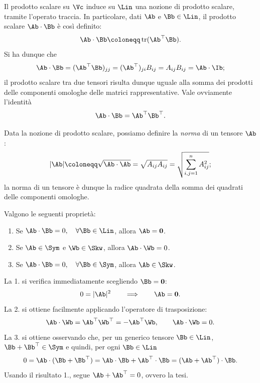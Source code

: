 Il prodotto scalare su $\Vc$ induce su $\Lin$ una nozione di prodotto scalare, tramite l'operato traccia. In particolare, dati $\Ab$ e $\Bb\in \Lin$, il prodotto scalare $\Ab \cdot \Bb$ è così definito:
\begin{equation}
\Ab \cdot \Bb \coloneqq \operatorname{tr}(\Ab ^\top \Bb).
\end{equation}
Si ha dunque che 
\begin{equation}
\Ab \cdot \Bb = (\Ab ^\top \Bb)_{jj}=(\Ab ^\top)_{ji}B_{ij}=A_{ij}B_{ij}=\Ab \cdot \Ib;
\end{equation}
 il prodotto scalare tra due tensori risulta dunque  uguale alla somma dei prodotti delle componenti omologhe delle matrici rappresentative. Vale ovviamente l'identità
 \begin{equation}
 	\Ab \cdot \Bb =\Ab ^\top \Bb ^\top.
 \end{equation}
 
 Data la nozione di prodotto scalare, possiamo definire la \textit{norma} di un tensore $\Ab$:
 \begin{equation}
 |\Ab|\coloneqq \sqrt{\Ab \cdot \Ab}=\sqrt{A_{ij}A_{ij}}=\sqrt{\sum_{i,j=1}^n A_{ij}^2};
 \end{equation}
la norma di un tensore è dunque la radice quadrata della somma dei quadrati delle componenti omologhe.

\vspace{.5cm}

\noindent Valgono le seguenti proprietà:
\begin{enumerate}
	\item Se $\Ab \cdot \Bb=0, \quad \forall \Bb \in \Lin$, allora $\Ab =\mathbf{0}$.
	\item Se $\Ab \in \Sym$ e $\Wb \in \Skw$, allora $\Ab \cdot \Wb =0$.
	\item Se $\Ab \cdot \Bb=0, \quad \forall \Bb \in \Sym$, allora $\Ab \in \Skw$.
\end{enumerate}

La 1. si verifica immediatamente scegliendo $\Bb =\mathbf{0}$:
\begin{equation}
0=|\Ab|^2 \qquad \Longrightarrow\qquad \Ab =\mathbf{0}.
\end{equation}
La 2. si ottiene facilmente applicando l'operatore di trasposizione:
\begin{equation}
\Ab \cdot \Wb =\Ab^\top \Wb^\top=-\Ab^\top \Wb, \qquad \Ab \cdot \Wb=0.
\end{equation}
La 3. si ottiene osservando che, per un generico tensore $\Bb \in \Lin$, $\Bb + \Bb ^\top\in \Sym$ e quindi, per ogni $\Bb \in \Lin$
\begin{equation}
0=\Ab \cdot (\Bb +\Bb ^\top)=\Ab \cdot \Bb + \Ab ^\top \cdot \Bb =(\Ab + \Ab ^\top)\cdot \Bb.
\end{equation}
Usando il risultato 1., segue $\Ab + \Ab ^\top=0$, ovvero la tesi.

